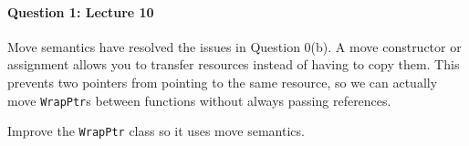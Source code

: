 \documentclass[12pt,letterpaper,twoside]{article}
\begin{document}
\begin{solution}

\end{solution}

\paragraph{Question 1: Lecture 10}

Move semantics have resolved the issues in Question 0(b). A move constructor or assignment allows you to transfer resources instead of having to copy them. This prevents two pointers from pointing to the same resource, so we can actually move \texttt{WrapPtr}s between functions without always passing references.

Improve the \texttt{WrapPtr} class so it uses move semantics.

\begin{solution}

\end{solution}
\end{document}
